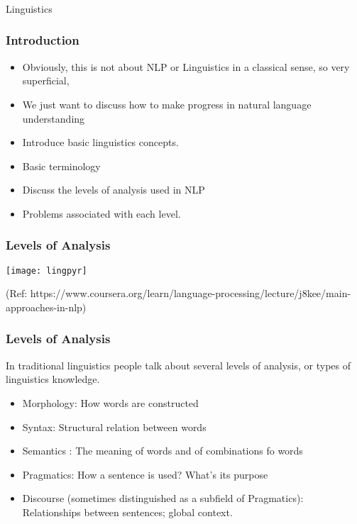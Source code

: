 \begin{frame}[fragile]\frametitle{}

\begin{center}
{\Large Linguistics}
\end{center}
\end{frame}

\begin{frame}[fragile]
  \frametitle{Introduction}
  \begin{itemize}
  \item Obviously, this is not about NLP or Linguistics in a classical sense, so very superficial, 
  \item We just want to discuss how to make progress in natural language understanding
  \item 
Introduce basic linguistics concepts. 
  \item 
Basic terminology 
  \item 
Discuss the levels of analysis used in NLP 
  \item 
Problems associated with each level.

  	  \end{itemize}
 \end{frame} 
 
  
\begin{frame}[fragile]
  \frametitle{Levels of Analysis}
  \begin{center}
\texttt{[image: lingpyr]}
\end{center}



(Ref: https://www.coursera.org/learn/language-processing/lecture/j8kee/main-approaches-in-nlp)
 \end{frame}

 
\begin{frame}[fragile]
  \frametitle{Levels of Analysis}
  In traditional linguistics people talk about several levels of analysis, or types of linguistics knowledge. 

  \begin{itemize}
  \item Morphology:
How words are constructed
 \item Syntax:
Structural relation between words
 \item Semantics :
The meaning of words and of combinations fo words
 \item Pragmatics: 
How a sentence is used? What’s its purpose
 \item Discourse (sometimes distinguished as a subfield of Pragmatics):
Relationships between sentences; global context. 
  	  \end{itemize}
 \end{frame} 
 



